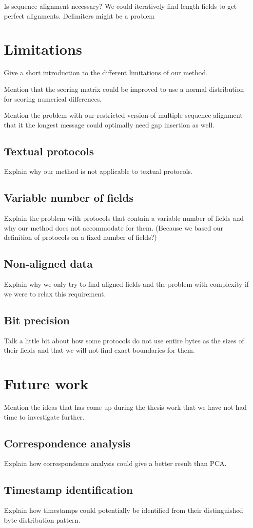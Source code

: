 \documentclass[a4paper]{report}
\begin{document}
Is sequence alignment necessary? We could iteratively find length fields to get
perfect alignments. Delimiters might be a problem

\section{Limitations}
Give a short introduction to the different limitations of our method.

Mention that the scoring matrix could be improved to use a normal distribution
for scoring numerical differences.

Mention the problem with our restricted version of multiple sequence alignment
that it the longest message could optimally need gap insertion as well.

\subsection{Textual protocols}
Explain why our method is not applicable to textual protocols.

\subsection{Variable number of fields}
Explain the problem with protocols that contain a variable number of fields and
why our method does not accommodate for them. (Because we based our definition
of protocols on a fixed number of fields?)

\subsection{Non-aligned data}
Explain why we only try to find aligned fields and the problem with complexity
if we were to relax this requirement.

\subsection{Bit precision}
Talk a little bit about how some protocols do not use entire bytes as the sizes
of their fields and that we will not find exact boundaries for them.

\section{Future work}
Mention the ideas that has come up during the thesis work that we have not had
time to investigate further.

\subsection{Correspondence analysis}
Explain how correspondence analysis could give a better result than PCA.

\subsection{Timestamp identification}
Explain how timestamps could potentially be identified from their distinguished
byte distribution pattern.



\end{document}
